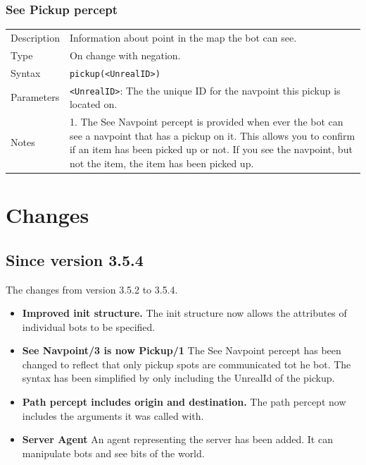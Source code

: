 \documentclass[11pt,a4paper]{article}
\begin{document}
\subsubsection*{See Pickup percept}
\begin{small}
\begin{tabular}{p{2cm}p{9cm}}
Description & Information about point in the map the bot can see.\\
Type & On change with negation.\\
Syntax & \verb|pickup(<UnrealID>)|\\
Parameters & \verb|<UnrealID>|: The the unique ID for the navpoint this pickup is located on.\\

Notes &
	1.	The See Navpoint percept is provided when ever the bot can see a navpoint that has a pickup on it. This allows you to confirm if an item has been picked up or not. If you see the navpoint, but not the item, the item has been picked up. \\
\end{tabular}
\end{small}

\section{Changes} 


\subsection{Since version 3.5.4}

The changes from version 3.5.2 to 3.5.4.

\begin{itemize}
	\item \textbf{Improved init structure.} The init structure now allows the attributes of individual bots to be specified.
	\item \textbf{See Navpoint/3 is now Pickup/1} The See Navpoint percept has been changed to reflect that only pickup spots are communicated tot he bot. The syntax has been simplified by only including the UnrealId of the pickup.
	\item \textbf{Path percept includes origin and destination.} The path percept now includes the arguments it was called with.
	\item \textbf{Server Agent} An agent representing the server has been added. It can manipulate bots and see bits of the world.
\end{itemize}
\end{document}
